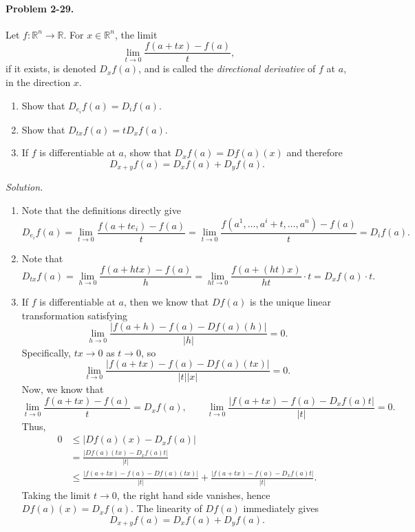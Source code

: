 \documentclass[11pt]{report}
\newcommand{\R}{\mathbb{R}}
\newcommand{\problem}[1]{\paragraph{Problem #1.}}
\newcommand{\solution}{\noindent\textit{Solution.} }
\begin{document}
    \problem{2-29} Let $f\colon \R^n \to \R$. For $x \in \R^n$, the limit \[
        \lim_{t \to 0} \frac{f(a + tx) - f(a)}{t},
    \] if it exists, is denoted $D_xf(a)$, and is called the \emph{directional
    derivative} of $f$ at $a$, in the direction $x$.
    \begin{enumerate}
        \itemsep0em
        \item Show that $D_{e_i}f(a) = D_if(a)$.
        \item Show that $D_{tx}f(a) = tD_xf(a)$.
        \item If $f$ is differentiable at $a$, show that $D_xf(a) = Df(a)(x)$ and
        therefore \[
            D_{x + y}f(a) = D_xf(a) + D_yf(a).
        \] 
    \end{enumerate} 

    \solution \begin{enumerate}
        \item Note that the definitions directly give \[
            D_{e_i}f(a) = \lim_{t \to 0} \frac{f(a + te_i) - f(a)}{t} = \lim_{t \to
            0} \frac{f(a^1, \dots, a^i + t, \dots, a^n) - f(a)}{t} = D_if(a).
        \] 

        \item Note that \[
            D_{tx}f(a) = \lim_{h \to 0} \frac{f(a + htx) - f(a)}{h} = \lim_{ht \to 0} \frac{f(a +
            (ht)x)}{ht} \cdot t = D_xf(a) \cdot t.
        \] 

        \item If $f$ is differentiable at $a$, then we know that $Df(a)$ is the
        unique linear transformation satisfying \[
            \lim_{h \to 0} \frac{|f(a + h) - f(a) - Df(a)(h)|}{|h|} = 0.
        \] Specifically, $tx \to 0$ as $t \to 0$, so \[
            \lim_{t \to 0} \frac{|f(a + tx) - f(a) - Df(a)(tx)|}{|t| |x|} = 0.
        \] Now, we know that \[
            \lim_{t \to 0} \frac{f(a + tx) - f(a)}{t} = D_xf(a), \qquad
            \lim_{t \to 0} \frac{|f(a + tx) - f(a) - D_xf(a)t|}{|t|} = 0.
        \] Thus, \begin{align*}
            0 &\leq |Df(a)(x) - D_xf(a)| \\
            &= \frac{|Df(a)(tx) - D_xf(a)t|}{|t|} \\
            &\leq \frac{|f(a + tx) - f(a) - Df(a)(tx)|}{|t|} + \frac{|f(a + tx) -
            f(a) - D_xf(a)t|}{|t|}.
        \end{align*}
        Taking the limit $t \to 0$, the right hand side vanishes, hence $Df(a)(x) =
        D_xf(a)$. The linearity of $Df(a)$ immediately gives \[
            D_{x + y}f(a) = D_xf(a) + D_yf(a).
        \] 
    \end{enumerate}
\end{document}
